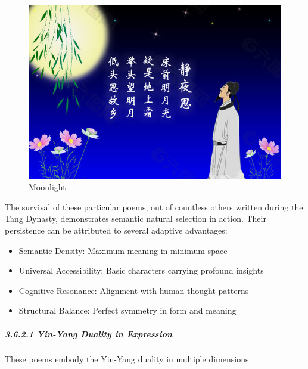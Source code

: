 \documentclass[
  11pt,
  letterpaper,
]{article}
\providecommand{\tightlist}{%
  \setlength{\itemsep}{0pt}\setlength{\parskip}{0pt}}
\begin{document}
\begin{figure}
\centering
\includegraphics{./images/poem_moonlight.jpg}
\caption{Moonlight}
\end{figure}

The survival of these particular poems, out of countless others written
during the Tang Dynasty, demonstrates semantic natural selection in
action. Their persistence can be attributed to several adaptive
advantages:

\begin{itemize}
\tightlist
\item
  Semantic Density: Maximum meaning in minimum space
\item
  Universal Accessibility: Basic characters carrying profound insights
\item
  Cognitive Resonance: Alignment with human thought patterns
\item
  Structural Balance: Perfect symmetry in form and meaning
\end{itemize}

\hypertarget{yin-yang-duality-in-expression}{%
\subparagraph{3.6.2.1 Yin-Yang Duality in
Expression}\label{yin-yang-duality-in-expression}}

These poems embody the Yin-Yang duality in multiple dimensions:
\end{document}
